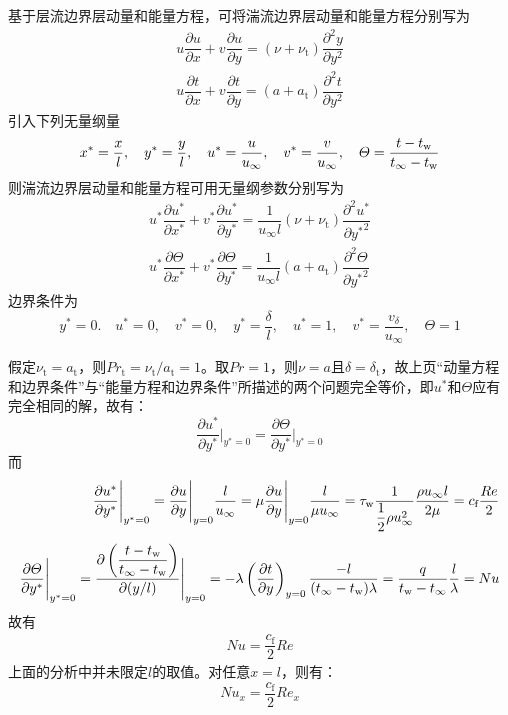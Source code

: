 基于层流边界层动量和能量方程，可将湍流边界层动量和能量方程分别写为
\begin{align}
	u\dfrac{\partial u}{\partial x} + v \dfrac{\partial u}{\partial y} = (\nu + \nu_\text{t})\dfrac{\partial^2 y}{\partial y^2}\\[0.5em]
	u\dfrac{\partial t}{\partial x} + v \dfrac{\partial t}{\partial y} = (a + a_\text{t})\dfrac{\partial^2 t}{\partial y^2}
\end{align}
引入下列无量纲量
\begin{equation}
	x^* = \dfrac{x}{l},\quad y^* = \dfrac{y}{l}, \quad u^* = \dfrac{u}{u_\infty}, \quad v^* = \dfrac{v}{u_\infty}, \quad \varTheta = \dfrac{t - t_{\text{w}}}{t_\infty - t_{\text{w}}}
\end{equation}
则湍流边界层动量和能量方程可用无量纲参数分别写为
\begin{align}
	u^*\dfrac{\partial u^*}{\partial x^*} + v^* \dfrac{\partial u^*}{\partial y^*} = \dfrac{1}{u_{\infty}l}(\nu + \nu_\text{t})\dfrac{\partial^2 u^*}{\partial {y^*}^2}\\[0.5em]
	u^*\dfrac{\partial \varTheta}{\partial x^*} + v^* \dfrac{\partial \varTheta}{\partial y^*} = \dfrac{1}{u_\infty l}(a + a_\text{t})\dfrac{\partial^2 \varTheta}{\partial {y^*}^2}
\end{align}
边界条件为
\begin{equation}
	y^* = 0.\quad u^*=0,\quad v^* = 0,\quad y^* = \dfrac{\delta}{l}, \quad u^* = 1,\quad v^*=\dfrac{v_\delta}{u_\infty}, \quad \varTheta = 1
\end{equation}

假定$\nu_\text{t} = a_\text{t}$，则$Pr_{\text{t}} = \nu_\text{t}/a_\text{t} = 1$。取$Pr=1$，则$ν=a$且$\delta =\delta_\text{t}$，故上页“动量方程和边界条件”与“能量方程和边界条件”所描述的两个问题完全等价，即$u^*$和$\varTheta$应有完全相同的解，故有：
\begin{equation}
	\dfrac{\partial u^*}{\partial y^*}\Bigg|_{y^* = 0} = \dfrac{\partial \varTheta}{\partial y^*}\Bigg|_{y^* = 0} 
\end{equation}
而
\begin{align*}
    \dfrac{\partial u^*}{\partial y^*}\Bigg|_{y^* = 0} = \dfrac{\partial u}{\partial y}\Bigg|_{y = 0} \dfrac{l}{u_\infty} = \mu \dfrac{\partial u}{\partial y}\Bigg|_{y = 0} \dfrac{l}{\mu u_\infty} = \tau_{\text{w}} \dfrac{1}{\dfrac{1}{2}\rho u_\infty^2} \dfrac{\rho u_\infty l}{2 \mu} = c_\text{f}\dfrac{Re}{2} \\[0.5em]
    \dfrac{\partial \varTheta}{\partial y^*}\Bigg|_{y^* = 0} = \dfrac{\partial \left(\dfrac{t - t_{\text{w}}}{t_\infty - t_{\text{w}}}\right)}{\partial (y/l)}\Bigg|_{y=0}  = - \lambda \left(\dfrac{\partial t}{\partial y}\right)_{y=0}\dfrac{-l}{(t_\infty- t_{\text{w}})\lambda} = \dfrac{q}{t_{\text{w}} - t_\infty}\dfrac{l}{\lambda} = Nu
\end{align*}
故有
\begin{align}
	Nu = \dfrac{c_\text{f}}{2}Re
\end{align}
上面的分析中并未限定$l$的取值。对任意$x=l$，则有：
\begin{equation}
	Nu_x = \dfrac{c_\text{f}}{2}Re_x
	\label{Nux}
\end{equation}

